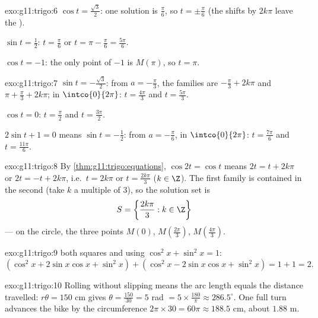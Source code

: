 \begin{solution}{exo:g11:trigo:6}
$\cos t = \frac{\sqrt3}{2}$: one solution is $\frac\pi6$, so
$t = \pm\frac\pi6$ (the shifts by $2k\pi$ leave the ).

$\sin t = \frac12$: $t = \frac\pi6$ or $t = \pi - \frac\pi6 =
\frac{5\pi}{6}$.

$\cos t = -1$: the only point of  $-1$ is $M(\pi)$, so $t = \pi$.
\end{solution}

\begin{solution}{exo:g11:trigo:7}
$\sin t = -\frac{\sqrt3}{2}$: from $a = -\frac\pi3$, the families are
$-\frac\pi3 + 2k\pi$ and $\pi + \frac\pi3 + 2k\pi$; in
$\intco{0}{2\pi}$: $t = \frac{4\pi}{3}$ and $t = \frac{5\pi}{3}$.

$\cos t = 0$: $t = \frac\pi2$ and $t = \frac{3\pi}{2}$.

$2\sin t + 1 = 0$ means $\sin t = -\frac12$: from $a = -\frac\pi6$, in
$\intco{0}{2\pi}$: $t = \frac{7\pi}{6}$ and $t = \frac{11\pi}{6}$.
\end{solution}

\begin{solution}{exo:g11:trigo:8}
By \cref{thm:g11:trigo:equations}, $\cos 2t = \cos t$ means
$2t = t + 2k\pi$ or $2t = -t + 2k\pi$, i.e.\ $t = 2k\pi$ or
$t = \frac{2k\pi}{3}$ ($k \in \Z$). The first family is contained in the
second (take $k$ a multiple of $3$), so the solution set is
\[
S = \left\{\frac{2k\pi}{3} : k \in \Z\right\}
\]
--- on the circle, the three points $M(0)$,
$M\!\left(\frac{2\pi}{3}\right)$, $M\!\left(\frac{4\pi}{3}\right)$.
\end{solution}

\begin{solution}{exo:g11:trigo:9}
 both squares and using $\cos^2 x + \sin^2 x = 1$:
\[
(\cos^2 x + 2\sin x\cos x + \sin^2 x)
+ (\cos^2 x - 2\sin x\cos x + \sin^2 x)
= 1 + 1 = 2 .
\]
\end{solution}

\begin{solution}{exo:g11:trigo:10}
Rolling without slipping means the arc length equals the distance
travelled: $r\theta = 150$ cm gives
$\theta = \frac{150}{30} = 5$ rad $= 5 \times \frac{180}{\pi} \approx
286.5^\circ$. One full turn advances the bike by the circumference
$2\pi \times 30 = 60\pi \approx 188.5$ cm, about $1.88$ m.
\end{solution}

